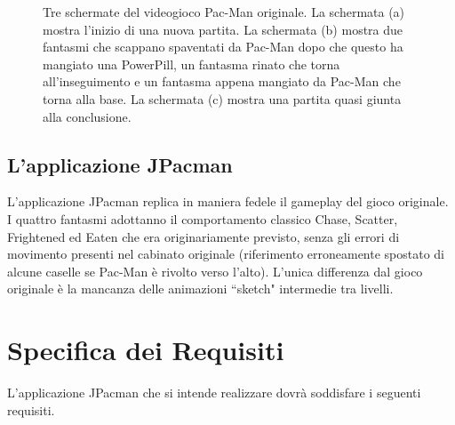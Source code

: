 \documentclass[12pt,a4paper]{report}
\begin{document}
\begin{figure}[hb!]
\begin{subfigure}{.32\textwidth}
  \caption{}
  \label{fig:snap3}
\end{subfigure}
\caption{Tre schermate del videogioco Pac-Man originale. La schermata (a) mostra l'inizio di una nuova partita. La schermata (b) mostra due fantasmi che scappano spaventati da Pac-Man dopo che questo ha mangiato una PowerPill, un fantasma rinato che torna all'inseguimento e un fantasma appena mangiato da Pac-Man che torna alla base. La schermata (c) mostra una partita quasi giunta alla conclusione.}
\label{fig:fig}
\end{figure}





\section{L'applicazione JPacman}\label{se:appjgal}
L'applicazione JPacman replica in maniera fedele il gameplay del gioco originale.
I quattro fantasmi adottanno il comportamento classico Chase, Scatter, Frightened ed Eaten che era originariamente previsto, senza gli errori di movimento presenti nel cabinato originale (riferimento erroneamente spostato di alcune caselle se Pac-Man è rivolto verso l'alto). L'unica differenza dal gioco originale è la mancanza delle animazioni ``sketch" intermedie tra livelli.



\chapter{Specifica dei Requisiti}\label{ch:spereq}

L'applicazione JPacman che si intende realizzare dovrà soddisfare i seguenti requisiti.
\end{document}
